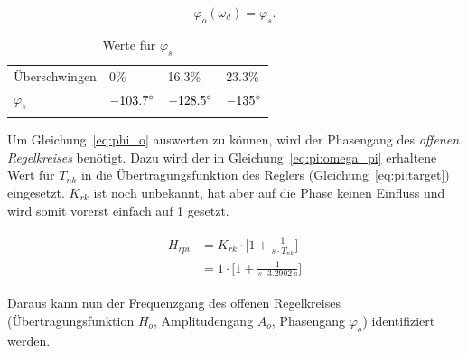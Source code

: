 \begin{equation} \label{eq:phi_o}
    \varphi_o(\omega_d)=\varphi_s.
\end{equation}

\begin{longtable}{llll}
    \toprule
    \endhead
    \endfoot
    \endlastfoot


    \"Uberschwingen & 0\%              & 16.3\%           & 23.3\% \\
    $\varphi_s$        & $-103.7 \degree$ & $-128.5 \degree$ & $-135 \degree$ \\

    \bottomrule
    \caption{Werte f\"ur $\varphi_s$}
    \label{tab:phi_s}
\end{longtable}

Um  Gleichung~\ref{eq:phi_o}  auswerten  zu   k\"onnen,  wird  der  Phasengang
des    \emph{offenen    Regelkreises}    ben\"otigt. Dazu    wird    der    in
Gleichung~\ref{eq:pi:omega_pi}    erhaltene    Wert    f\"ur    $T_{nk}$    in
die   \"Ubertragungsfunktion    des   Reglers   (Gleichung~\ref{eq:pi:target})
eingesetzt. $K_{rk}$  ist  noch  unbekannt,  hat aber  auf  die  Phase  keinen
Einfluss und wird somit vorerst einfach auf 1 gesetzt.

\begin{gather} \label{eq:pi:target:inserted}
    \begin{split}
        H_{rpi} & = K_{rk} \cdot \biggl[ 1 + \frac{1}{s \cdot T_{nk}} \biggr] \\
                & = 1      \cdot \biggl[ 1 + \frac{1}{s \cdot \SI{3.2902}{\second}} \biggr]
    \end{split}
\end{gather}

Daraus    kann    nun    der    Frequenzgang    des    offenen    Regelkreises
(\"Ubertragungsfunktion $H_o$,  Amplitudengang $A_o$,  Phasengang $\varphi_o$)
identifiziert werden.


